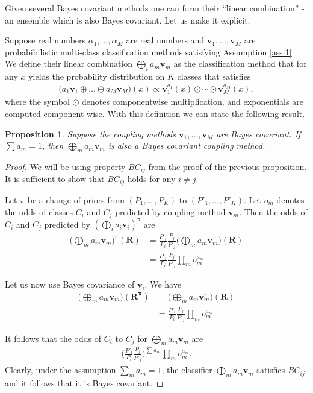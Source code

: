 \documentclass[twoside,11pt]{article}
\newtheorem{prop}{Proposition}
\begin{document}
Given several Bayes covariant methods one can form  their ``linear combination'' - an ensemble which is also Bayes covariant. Let us make it explicit.

Suppose real numbers $\alpha_1, \ldots,\alpha_M$ are real numbers and $\boldsymbol{v}_1, \ldots, \boldsymbol{v}_M$ are probabibilistic multi-class classification methods satisfying Assumption \ref{ass:1}. We define their linear combination $\bigoplus_i a_m \boldsymbol{v}_m$ as the classification method that for any $x$ yields the probability distribution on $K$ classes that satisfies
\begin{align*}
 	\bigl(a_1 \boldsymbol{v}_1 \oplus \ldots \oplus a_M \boldsymbol{v}_M\bigr)(x) \propto \boldsymbol{v}_1^{a_1}(x) \odot \cdots \odot \boldsymbol{v}_M^{a_M}(x),
\end{align*}
where the symbol $\odot$ denotes componentwise multiplication, and exponentials are computed component-wise. With this definition we can state the following result.

\begin{prop}
Suppose the coupling methods $\boldsymbol{v}_1, \ldots, \boldsymbol{v}_M$ are Bayes covariant. If $\sum a_m = 1$, then $\bigoplus_m a_m \boldsymbol{v}_m$ is also a Bayes covariant coupling method.
\end{prop}

\begin{proof}
We will be using property $BC_{ij}$ from the proof of the previous proposition. It is sufficient to show that $BC_{ij}$ holds for any $i\not= j$. 

Let $\pi$ be a change of priors from $(P_1, \ldots, P_K)$  to $(P'_1, \ldots, P'_K)$. Let $o_m$ denotes the odds of classes $C_i$ and $C_j$ predicted by coupling method $\boldsymbol{v}_m$. Then the odds of $C_i$ and $C_j$ predicted by $(\bigoplus_i a_i \boldsymbol{v}_i)^\pi$ are 
\begin{align}
	\biggl(\bigoplus_m a_m \boldsymbol{v}_m\biggr)^\pi(\boldsymbol{R}) & = \frac{P'_i}{P_i} \frac{P_j}{P'_j} \biggl(\bigoplus_m a_m \boldsymbol{v}_m\biggr)(\boldsymbol{R}) \\
	&= \frac{P'_i}{P_i} \frac{P_j}{P'_j} \prod_m o_m^{a_m}
\end{align}

Let us now use Bayes covariance of $\boldsymbol{v}_i$. We have
\begin{align}
	\biggl(\bigoplus_m a_m \boldsymbol{v}_m\biggr)(\boldsymbol{R^\pi}) & =  \biggl(\bigoplus_m a_m \boldsymbol{v}_m^\pi\biggr)(\boldsymbol{R}) \\
	&= \frac{P'_i}{P_i} \frac{P_j}{P'_j} \prod_m o_m^{a_m}
\end{align}

It follows that the odds of $C_i$ to $C_j$ for $\bigoplus_m a_m \boldsymbol{v}_m$ are 
\begin{align}
\biggl(\frac{P'_i}{P_i} \frac{P_j}{P'_j} \biggr)^{\sum a_m} \prod_m o_m^{a_m}.
\end{align}
Clearly, under the assumption $\sum_m a_m = 1$, the classifier $\bigoplus_m a_m \boldsymbol{v}_m$ satisfies $BC_{ij}$ and it follows that it is Bayes covariant.
\end{proof}
\end{document}
